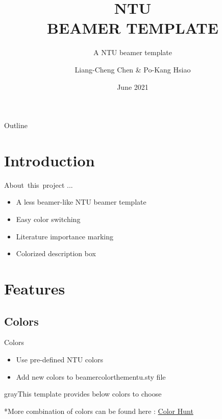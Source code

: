 \documentclass[pdf]{beamer}
\title{NTU \\BEAMER TEMPLATE}
\subtitle{A NTU beamer template}
\author{Liang-Cheng Chen \& Po-Kang Hsiao}
\date{June 2021}
\begin{document}
\inserttitlepage

\begin{frame}{Outline}

    \tableofcontents
    
\end{frame}


\section{Introduction}

\begin{frame}{About\, this\, project ...}

    \begin{itemize}
        \item A less beamer-like NTU beamer template 
        \item Easy color switching
        \item Literature importance marking
        \item Colorized description box
    \end{itemize}
    
\end{frame}


\section{Features}

\subsection{Colors}

\begin{frame}{Colors}

\begin{itemize}
    \item Use pre-defined NTU colors
    \item Add new colors to \alert{beamercolorthementu.sty} file
\end{itemize}
\vspace{.5cm}
\begin{mybox}{gray}{This template provides below colors to choose}
    \begin{testcolors}[rgb]
        
        
        
    \end{testcolors}
    
    
    
\end{mybox} 
\scriptsize{*More combination of colors can be found here : \href{https://colorhunt.co}{Color Hunt}}
\end{frame}
\end{document}
